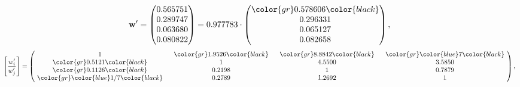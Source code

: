 \begin{example}
\begin{equation*}
\mathbf{w}^{\prime} =
\begin{pmatrix}
0.565751\\
0.289747\\
0.063680\\
0.080822
\end{pmatrix} =
0.977783\cdot
\begin{pmatrix}
\color{gr} 0.578606\color{black} \\
0.296331\\
0.065127\\
0.082658
\end{pmatrix},
\end{equation*}
\begin{equation*}
\left[ \frac{{w}^{\prime}_i}{{w}^{\prime}_j} \right] =
\begin{pmatrix}
$\,\,$ 1 $\,\,$ & $\,\,$\color{gr} 1.9526\color{black} $\,\,$ & $\,\,$\color{gr} 8.8842\color{black} $\,\,$ & $\,\,$\color{gr} \color{blue} 7\color{black} $\,\,$ \\
$\,\,$\color{gr} 0.5121\color{black} $\,\,$ & $\,\,$ 1 $\,\,$ & $\,\,$4.5500$\,\,$ & $\,\,$3.5850  $\,\,$ \\
$\,\,$\color{gr} 0.1126\color{black} $\,\,$ & $\,\,$0.2198$\,\,$ & $\,\,$ 1 $\,\,$ & $\,\,$0.7879 $\,\,$ \\
$\,\,$\color{gr} \color{blue}  1/7\color{black} $\,\,$ & $\,\,$0.2789$\,\,$ & $\,\,$1.2692$\,\,$ & $\,\,$ 1  $\,\,$ \\
\end{pmatrix},
\end{equation*}
\end{example}
\newpage
